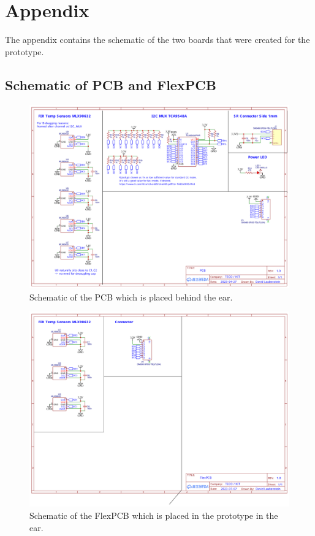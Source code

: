 \chapter{Appendix}
\label{ch:appendix}
The appendix contains the schematic of the two boards that were created for the prototype. 

\section{Schematic of PCB and FlexPCB}
\label{ch:appendix:pcb_flexpcb}

\begin{figure}
    \centering
    \includegraphics[width=\textwidth]{thesis-doc/images/prototype/schematic/Schematic_Open Earable 1.3 - I2C PCB David_2023-10-17.pdf}
    \caption{Schematic of the PCB which is placed behind the ear.}    
    \label{fig:appendix:schematic_pcb}
\end{figure} 

\begin{figure}
    \centering
    \includegraphics[width=\textwidth]{thesis-doc/images/prototype/schematic/Schematic_Open Earable 1.3 - I2C FlexPCB David_2023-10-17.pdf}
    \caption{Schematic of the FlexPCB which is placed in the prototype in the ear.}    
    \label{fig:appendix:schematic_pcb}
\end{figure} 
